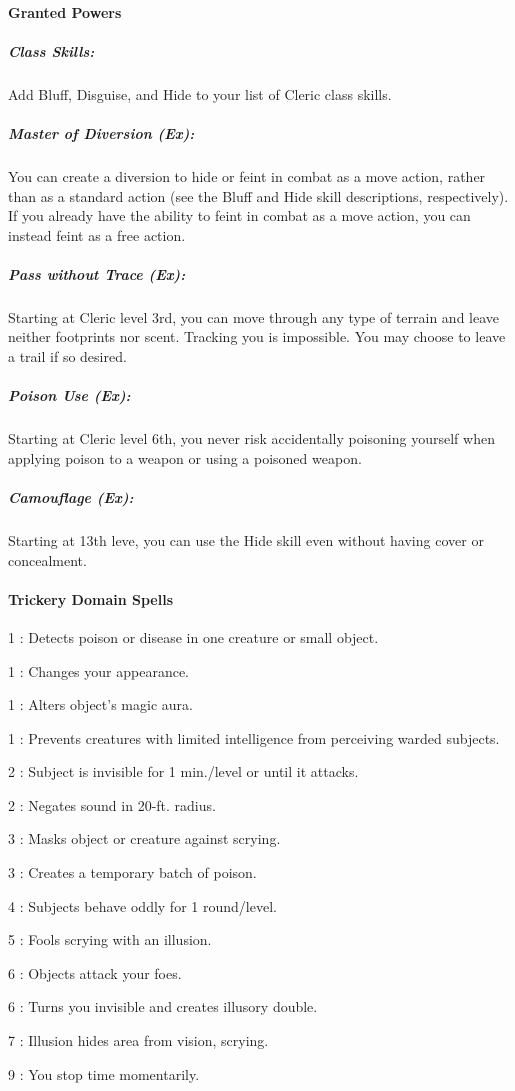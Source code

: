 \paragraph{Granted Powers}
\subparagraph{Class Skills:} Add Bluff, Disguise, and Hide to your list of Cleric class skills.
\subparagraph{Master of Diversion (Ex):}
You can create a diversion to hide or feint in combat as a move action, rather than as a standard action (see the Bluff and Hide skill descriptions, respectively). 
If you already have the ability to feint in combat as a move action, you can instead feint as a free action.
\subparagraph{Pass without Trace (Ex):}
Starting at Cleric level 3rd, you can move through any type of terrain and leave neither footprints nor scent. Tracking you is impossible. You may choose to leave a trail if so desired.
\subparagraph{Poison Use (Ex):}
Starting at Cleric level 6th, you never risk accidentally poisoning yourself when applying poison to a weapon or using a poisoned weapon.
\subparagraph{Camouflage (Ex):}
Starting at 13th leve, you can use the Hide skill even without having cover or concealment.
\paragraph{Trickery Domain Spells}
\begin{list}{}{\leftmargin=1em}
\item[1] : Detects poison or disease in one creature or small object.
\item[1] : Changes your appearance.
\item[1] : Alters object's magic aura.
\item[1] : Prevents creatures with limited intelligence from perceiving warded subjects.
\item[2] : Subject is invisible for 1 min./level or until it attacks.
\item[2] : Negates sound in 20-ft. radius.
\item[3] : Masks object or creature against scrying.
\item[3] : Creates a temporary batch of poison.
\item[4] : Subjects behave oddly for 1 round/level.
\item[5] : Fools scrying with an illusion.
\item[6] : Objects attack your foes.
\item[6]  : Turns you invisible and creates illusory double.
\item[7] : Illusion hides area from vision, scrying.
\item[9] : You stop time momentarily.
\end{list}
